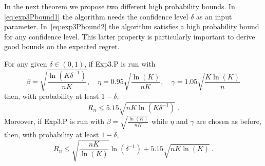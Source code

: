 \documentclass[11pt]{hackednow}
\begin{document}
In the next theorem we propose two different high probability bounds. In \eqref{eq:exp3Pbound1} the algorithm needs the confidence level $\delta$ as an input parameter. In~\eqref{eq:exp3Pbound2} the algorithm satisfies a high probability bound for any confidence level. This latter property is particularly important to derive good bounds on the expected regret.
\begin{theorem} \label{th:exp3P}
For any given $\delta \in (0,1)$, if Exp3.P is run with
\[
    \beta = \sqrt{\frac{\ln(K \delta^{-1})}{n K}}, \quad \eta = 0.95 \sqrt{\frac{\ln(K)}{n K}}, \quad \gamma = 1.05 \sqrt{\frac{K \ln(K)}{n}}
\]
then, with probability at least $1-\delta$,
\begin{equation} \label{eq:exp3Pbound1}
R_n \leq 5.15 \sqrt{n K \ln(K \delta^{-1})}~.
\end{equation}
Moreover, if Exp3.P is run with
$
    \beta = \sqrt{\tfrac{\ln(K)}{n K}} $
while $\eta$ and $\gamma$ are chosen as before, then, with probability at least $1-\delta$,
\begin{equation} \label{eq:exp3Pbound2}
R_n \leq \sqrt{\frac{n K}{\ln(K)}} \ln(\delta^{-1}) + 5.15 \sqrt{n K \ln(K)}~.
\end{equation}
\end{theorem}
\end{document}
